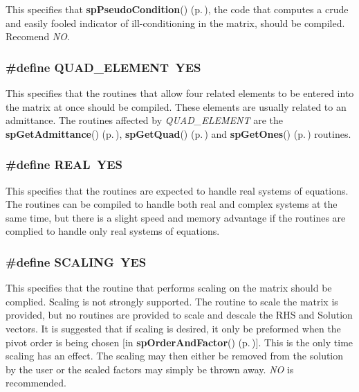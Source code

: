 This specifies that {\bf sp\-Pseudo\-Condition}() {\rm (p.\,\pageref{spUtils_8c_a19})}, the code that computes a crude and easily fooled indicator of ill-conditioning in the matrix, should be compiled. Recomend {\em NO}. 
\subsubsection{\setlength{\rightskip}{0pt plus 5cm}\#define QUAD\_\-ELEMENT\ YES}\label{spConfig_8h_a10}


This specifies that the routines that allow four related elements to be entered into the matrix at once should be compiled. These elements are usually related to an admittance. The routines affected by {\em QUAD\_\-ELEMENT} are the {\bf sp\-Get\-Admittance}() {\rm (p.\,\pageref{spBuild_8c_a13})}, {\bf sp\-Get\-Quad}() {\rm (p.\,\pageref{spBuild_8c_a14})} and {\bf sp\-Get\-Ones}() {\rm (p.\,\pageref{spBuild_8c_a15})} routines. 
\subsubsection{\setlength{\rightskip}{0pt plus 5cm}\#define REAL\ YES}\label{spConfig_8h_a0}


This specifies that the routines are expected to handle real systems of equations. The routines can be compiled to handle both real and complex systems at the same time, but there is a slight speed and memory advantage if the routines are complied to handle only real systems of equations. 
\subsubsection{\setlength{\rightskip}{0pt plus 5cm}\#define SCALING\ YES}\label{spConfig_8h_a12}


This specifies that the routine that performs scaling on the matrix should be complied. Scaling is not strongly supported. The routine to scale the matrix is provided, but no routines are provided to scale and descale the RHS and Solution vectors. It is suggested that if scaling is desired, it only be preformed when the pivot order is being chosen [in {\bf sp\-Order\-And\-Factor}() {\rm (p.\,\pageref{spFactor_8c_a24})}]. This is the only time scaling has an effect. The scaling may then either be removed from the solution by the user or the scaled factors may simply be thrown away. {\em NO} is recommended. 
